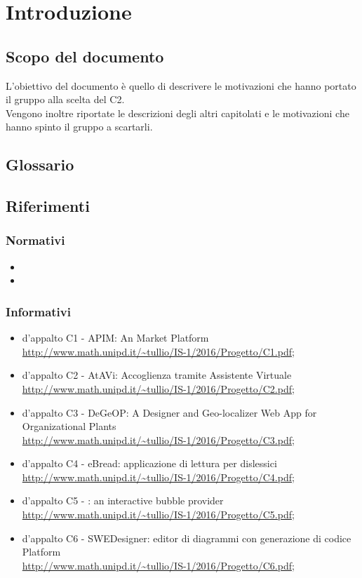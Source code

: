 \section {Introduzione}
	\subsection {Scopo del documento}
		L'obiettivo del documento è quello di descrivere le motivazioni che hanno portato il gruppo \GRUPPO{} alla scelta del  C2.  \\
		Vengono inoltre riportate le descrizioni degli altri capitolati e le motivazioni che hanno spinto il gruppo a scartarli.
	\subsection {Glossario}
		\GLOSSARIO
	\subsection {Riferimenti}
		\subsubsection {Normativi}
			\begin {itemize}
				\item \NPdoc
				\item \GldocRR
			\end {itemize}
		\subsubsection {Informativi}
			\begin {itemize}
				\item {} d'appalto C1 - APIM: An  Market Platform \\
					\url {http://www.math.unipd.it/~tullio/IS-1/2016/Progetto/C1.pdf};
				\item {} d'appalto C2 - AtAVi: Accoglienza tramite Assistente Virtuale \\
				\url {http://www.math.unipd.it/~tullio/IS-1/2016/Progetto/C2.pdf};
				\item {} d'appalto C3 - DeGeOP: A Designer and Geo-localizer Web App for Organizational Plants \\
					\url {http://www.math.unipd.it/~tullio/IS-1/2016/Progetto/C3.pdf};
					\item {} d'appalto C4 - eBread: applicazione di lettura per dislessici  \\
					\url {http://www.math.unipd.it/~tullio/IS-1/2016/Progetto/C4.pdf};
					\item {} d'appalto C5 - : an interactive bubble provider \\
					\url {http://www.math.unipd.it/~tullio/IS-1/2016/Progetto/C5.pdf};
					\item {} d'appalto C6 - SWEDesigner: editor di diagrammi  con generazione di codice Platform \\
					\url {http://www.math.unipd.it/~tullio/IS-1/2016/Progetto/C6.pdf};
					
				
			\end {itemize}
		
		